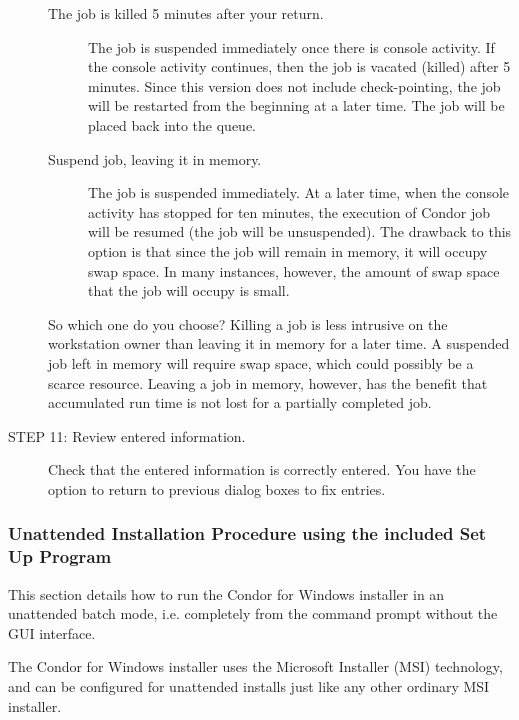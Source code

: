 \begin{description}
     \begin{description}
     \item[The job is killed 5 minutes after your return.]
     The job is suspended immediately once there is console activity.
     If the console activity continues, then the job is
     vacated (killed) after 5 minutes. 
     Since this version does not include check-pointing, the job will
     be restarted from the beginning at a later time.
     The job will be placed back into the queue.
     \item[ Suspend job, leaving it in memory.]
     The job is suspended immediately.  At a later time, when the
	 console activity has stopped for ten minutes, the execution of
	 Condor job will be resumed (the job will be unsuspended).
	 The drawback to this option is that since the job will remain
	 in memory, it will occupy swap space.  In many instances, however,
	 the amount of swap space that the job will occupy is small.
     \end{description}

     So which one do you choose?  Killing a job is less intrusive
	 on the workstation owner than leaving it in memory for a later time.
     A suspended job left in memory will require swap space,
     which could possibly be a scarce resource.
     Leaving a job in memory, however, has the benefit that accumulated
     run time is not lost for a partially completed job.

\item[STEP 11: Review entered information.]
     Check that the entered information is correctly entered.
     You have the option to return to previous dialog boxes to fix entries.
\end{description}


\subsubsection{\label{sec:nt-unattended-install-procedure}
Unattended Installation Procedure using the included Set Up Program}

This section details how to run the Condor for Windows installer in an
unattended batch mode, i.e. completely from the command prompt without the
GUI interface.

The Condor for Windows installer uses the Microsoft Installer (MSI)
technology, and can be configured for unattended installs just like any
other ordinary MSI installer.

